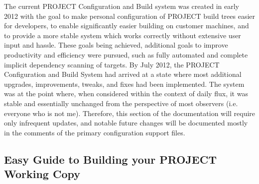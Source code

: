 \documentclass[12pt,letterpaper]{article}
\begin{document}
The current PROJECT Configuration and Build system was created in early 2012 with the goal to make personal configuration of PROJECT build trees easier for developers, to enable significantly easier building on customer machines, and to provide a more stable system which works correctly without extensive user input and hassle.  These goals being achieved, additional goals to improve productivity and efficiency were pursued, such as fully automated and complete implicit dependency scanning of targets.  By July 2012, the PROJECT Configuration and Build System had arrived at a state where most additional upgrades, improvements, tweaks, and fixes had been implemented.  The system was at the point where, when considered within the context of daily flux, it was stable and essentially unchanged from the perspective of most observers (i.e. everyone who is not me).  Therefore, this section of the documentation will require only infrequent updates, and notable future changes will be documented mostly in the comments of the primary configuration support files.

\subsection{Easy Guide to Building your PROJECT Working Copy}
\end{document}
